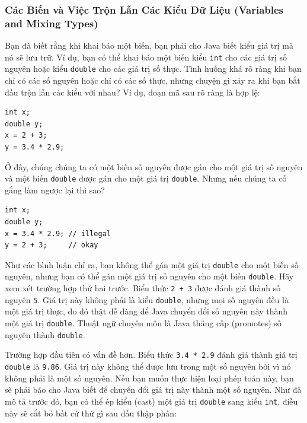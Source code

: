 \subsubsection{Các Biến và Việc Trộn Lẫn Các Kiểu Dữ Liệu (Variables and
Mixing
Types)}\label{cuxe1c-biux1ebfn-vuxe0-viux1ec7c-trux1ed9n-lux1eabn-cuxe1c-kiux1ec3u-dux1eef-liux1ec7u-variables-and-mixing-types}

Bạn đã biết rằng khi khai báo một biến, bạn phải cho Java biết kiểu giá
trị mà nó sẽ lưu trữ. Ví dụ, bạn có thể khai báo một biến kiểu
\texttt{int} cho các giá trị số nguyên hoặc kiểu \texttt{double} cho các
giá trị số thực. Tình huống khá rõ ràng khi bạn chỉ có các số nguyên
hoặc chỉ có các số thực, nhưng chuyện gì xảy ra khi bạn bắt đầu trộn lẫn
các kiểu với nhau? Ví dụ, đoạn mã sau rõ ràng là hợp lệ:

\begin{verbatim}
int x;
double y;
x = 2 + 3;
y = 3.4 * 2.9;
\end{verbatim}

Ở đây, chúng chúng ta có một biến số nguyên được gán cho một giá trị số
nguyên và một biến \texttt{double} được gán cho một giá trị
\texttt{double}. Nhưng nếu chúng ta cố gắng làm ngược lại thì sao?

\begin{verbatim}
int x;
double y;
x = 3.4 * 2.9; // illegal
y = 2 + 3;     // okay
\end{verbatim}

Như các bình luận chỉ ra, bạn không thể gán một giá trị \texttt{double}
cho một biến số nguyên, nhưng bạn có thể gán một giá trị số nguyên cho
một biến \texttt{double}. Hãy xem xét trường hợp thứ hai trước. Biểu
thức \texttt{2\ +\ 3} được đánh giá thành số nguyên \texttt{5}. Giá trị
này không phải là kiểu \texttt{double}, nhưng mọi số nguyên đều là một
giá trị thực, do đó thật dễ dàng để Java chuyển đổi số nguyên này thành
một giá trị \texttt{double}. Thuật ngữ chuyên môn là Java thăng cấp
(promotes) số nguyên thành \texttt{double}.

Trường hợp đầu tiên có vấn đề hơn. Biểu thức \texttt{3.4\ *\ 2.9} đánh
giá thành giá trị \texttt{double} là \texttt{9.86}. Giá trị này không
thể được lưu trong một số nguyên bởi vì nó không phải là một số nguyên.
Nếu bạn muốn thực hiện loại phép toán này, bạn sẽ phải báo cho Java biết
để chuyển đổi giá trị này thành một số nguyên. Như đã mô tả trước đó,
bạn có thể ép kiểu (cast) một giá trị \texttt{double} sang kiểu
\texttt{int}, điều này sẽ cắt bỏ bất cứ thứ gì sau dấu thập phân:

